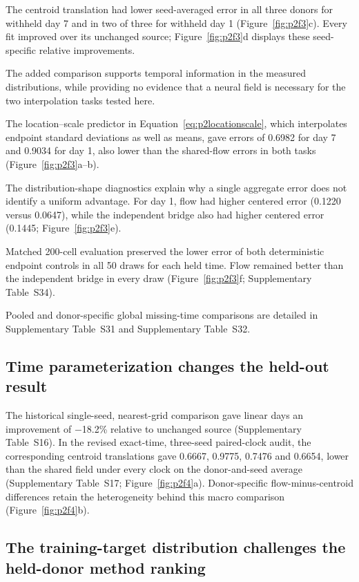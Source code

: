 \documentclass[10pt,a4paper]{article}
\begin{document}
The centroid translation had lower seed-averaged error in all three donors for withheld day 7 and in two of three for withheld day 1 (Figure~\ref{fig:p2f3}c). Every fit improved over its unchanged source; Figure~\ref{fig:p2f3}d displays these seed-specific relative improvements.

The added comparison supports temporal information in the measured distributions, while providing no evidence that a neural field is necessary for the two interpolation tasks tested here.

The location--scale predictor in Equation~\eqref{eq:p2locationscale}, which interpolates endpoint standard deviations as well as means, gave errors of 0.6982 for day 7 and 0.9034 for day 1, also lower than the shared-flow errors in both tasks (Figure~\ref{fig:p2f3}a--b).

The distribution-shape diagnostics explain why a single aggregate error does not identify a uniform advantage. For day 1, flow had higher centered error (0.1220 versus 0.0647), while the independent bridge also had higher centered error (0.1445; Figure~\ref{fig:p2f3}e).

Matched 200-cell evaluation preserved the lower error of both deterministic endpoint controls in all 50 draws for each held time. Flow remained better than the independent bridge in every draw (Figure~\ref{fig:p2f3}f; Supplementary Table~S34).

Pooled and donor-specific global missing-time comparisons are detailed in Supplementary Table~S31 and Supplementary Table~S32.

\subsection{Time parameterization changes the held-out result}

The historical single-seed, nearest-grid comparison gave linear days an improvement of −18.2\% relative to unchanged source (Supplementary Table~S16). In the revised exact-time, three-seed paired-clock audit, the corresponding centroid translations gave 0.6667, 0.9775, 0.7476 and 0.6654, lower than the shared field under every clock on the donor-and-seed average (Supplementary Table~S17; Figure~\ref{fig:p2f4}a\label{call:p2f4}). Donor-specific flow-minus-centroid differences retain the heterogeneity behind this macro comparison (Figure~\ref{fig:p2f4}b).



\subsection{The training-target distribution challenges the held-donor method ranking}
\end{document}
